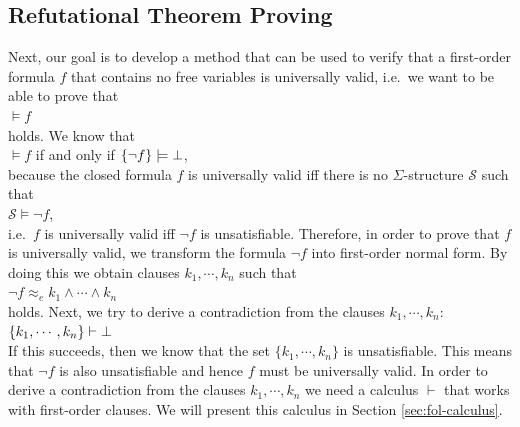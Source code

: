 \subsection{Refutational Theorem Proving}
Next, our goal is to develop a method that can be used to verify that a first-order formula
$f$ that contains no free variables is universally valid, i.e.~we want to be able to prove that \\[0.2cm]
\hspace*{1.3cm}
$\models f$
\\[0.2cm]
holds.  We know that \\[0.2cm]
\hspace*{1.3cm}
$\models f$ \quad if and only if \quad $\{\neg f\} \models \bot$, \\[0.2cm]
because the closed formula $f$ is universally valid iff there is no $\Sigma$-structure $\mathcal{S}$ such that
\\[0.2cm]
\hspace*{1.3cm}
$\mathcal{S} \models \neg f$,
\\[0.2cm]
i.e.~$f$ is universally valid iff $\neg f$ is unsatisfiable. 
Therefore, in order to prove that $f$ is universally valid, we transform the formula $\neg f$  into 
first-order normal form.  By doing this we obtain clauses $k_1, \cdots, k_n$ such that \\[0.2cm]
\hspace*{1.3cm} $\neg f \approx_e k_1 \wedge \cdots \wedge k_n$ \\[0.2cm]
holds.  Next,  we try to
derive a contradiction from the clauses $k_1,\cdots,k_n$: \\[0.2cm]
\hspace*{1.3cm} $\{k_1, \cdots, k_n\} \vdash \bot$ \\[0.2cm]
If this succeeds, then we know that the set $\{k_1, \cdots, k_n\}$ is unsatisfiable.
This means that $\neg f$ is also unsatisfiable and hence $f$ must be universally valid.
In order to derive a contradiction from the clauses $k_1,\cdots,k_n$
we need a calculus $\vdash$ that works with first-order clauses. 
We will present this calculus in Section \ref{sec:fol-calculus}.

